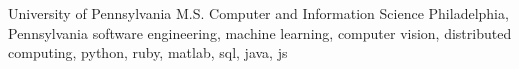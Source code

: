 \cventry
    {University of Pennsylvania} %
    {M.S. Computer and Information Science} %
    {Philadelphia, Pennsylvania} %
    {} %
    {software engineering, machine learning, computer vision, distributed computing, python, ruby, matlab, sql, java, js} %
    {
    }

